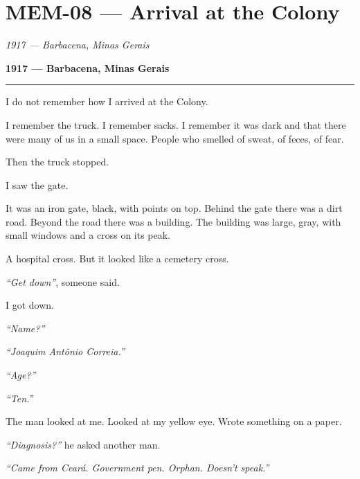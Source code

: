 \section*{\textbf{MEM-08} --- Arrival at the Colony}

\noindent \textit{1917 --- Barbacena, Minas Gerais}

\noindent \textbf{1917 --- Barbacena, Minas Gerais}

\vspace{0.5em}\noindent\rule{\textwidth}{0.5pt}\vspace{0.5em}

\noindent I do not remember how I arrived at the Colony.

\noindent I remember the truck. I remember sacks. I remember it was dark and that there were many of us in a small space. People who smelled of sweat, of feces, of fear.

\noindent Then the truck stopped.

\noindent I saw the gate.

\noindent It was an iron gate, black, with points on top. Behind the gate there was a dirt road. Beyond the road there was a building. The building was large, gray, with small windows and a cross on its peak.

\noindent A hospital cross. But it looked like a cemetery cross.

\noindent \textit{\textquotedblleft{}Get down\textquotedblright{}}, someone said.

\noindent I got down.

\noindent \textit{\textquotedblleft{}Name?\textquotedblright{}}

\noindent \textit{\textquotedblleft{}Joaquim Antônio Correia.\textquotedblright{}}

\noindent \textit{\textquotedblleft{}Age?\textquotedblright{}}

\noindent \textit{\textquotedblleft{}Ten.\textquotedblright{}}

\noindent The man looked at me. Looked at my yellow eye. Wrote something on a paper.

\noindent \textit{\textquotedblleft{}Diagnosis?\textquotedblright{}} he asked another man.

\noindent \textit{\textquotedblleft{}Came from Ceará. Government pen. Orphan. Doesn't speak.\textquotedblright{}}

